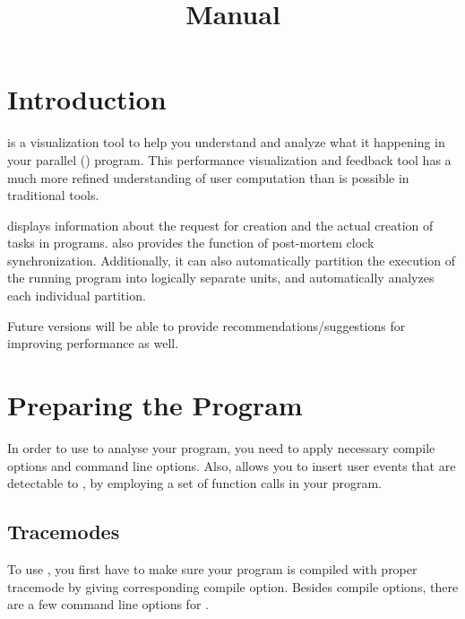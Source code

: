 \documentclass[10pt,dvips]{article}
\title{\projections{} Manual}
\begin{document}
\maketitle

\section{Introduction}
\projections{} is a visualization tool to help you understand and analyze what it
happening in your parallel (\charmpp{}) program. This performance visualization and
feedback tool has a much more refined understanding of user computation than is
possible in traditional tools.

\projections{} displays information about the request for creation and the
actual creation of tasks in \charmpp{} programs. \projections{} also provides the
function of post-mortem clock synchronization. Additionally, it can also
automatically partition the execution of the running program into logically
separate units, and automatically analyzes each individual partition.

Future versions will be able to provide recommendations/suggestions for
improving performance as well.

\section{Preparing the \charmpp{} Program}

In order to use \projections{} to analyse your program, you need to apply
necessary compile options and command line options. Also, \charmpp{} allows
you to insert user events that are detectable to \projections{}, by employing
a set of function calls in your program.

\subsection{Tracemodes}
To use \projections{}, you first have to make sure your \charmpp{} program is
compiled with proper \projections{} tracemode by giving corresponding compile
option. Besides compile options, there are a few command line options for
\projections{}.

\
\end{document}
